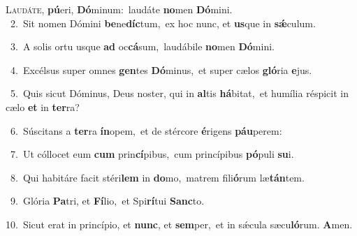 \lettrine{\initial\textcolor{\initialcolor}{L}}{audáte,} \textbf{pú}\-eri, \textbf{Dó}\-minum:~\star laudáte \textbf{no}\-men \textbf{Dó}\-mini.\\
{\numbfont\textcolor{\numbcolor}{~2.}}~Sit nomen Dómini \textbf{be}\-ne\-\textbf{díc}\-tum,~\star ex hoc nunc, et \textbf{us}\-que in \textbf{sǽ}\-culum.\par
{\numbfont\textcolor{\numbcolor}{~3.}}~A solis ortu usque \textbf{ad} oc\-\textbf{cá}\-sum,~\star laudábile \textbf{no}\-men \textbf{Dó}\-mini.\par
{\numbfont\textcolor{\numbcolor}{~4.}}~Excélsus super omnes \textbf{gen}\-tes \textbf{Dó}\-minus,~\star et super cælos \textbf{gló}\-ria \textbf{e}\-jus.\par
{\numbfont\textcolor{\numbcolor}{~5.}}~Quis sicut Dóminus, Deus noster, qui in \textbf{al}\-tis \textbf{há}\-bitat,~\star et humília réspicit in cælo \textbf{et} in \textbf{ter}\-ra?\par
{\numbfont\textcolor{\numbcolor}{~6.}}~Súscitans a \textbf{ter}\-ra \textbf{ín}\-opem,~\star et de stércore \textbf{é}\-rigens \textbf{páu}\-perem:\par
{\numbfont\textcolor{\numbcolor}{~7.}}~Ut cóllocet eum \textbf{cum} prin\-\textbf{cí}\-pibus,~\star cum princípibus \textbf{pó}\-puli \textbf{su}\-i.\par
{\numbfont\textcolor{\numbcolor}{~8.}}~Qui habitáre facit stéri\textbf{lem} in \textbf{do}\-mo,~\star matrem fili\-\textbf{ó}\-rum læ\-\textbf{tán}\-tem.\par
{\numbfont\textcolor{\numbcolor}{~9.}}~Glória \textbf{Pa}\-tri, et \textbf{Fí}\-lio,~\star et Spi\-\textbf{rí}\-tui \textbf{Sanc}\-to.\par
{\numbfont\textcolor{\numbcolor}{10.}}~Sicut erat in princípio, et \textbf{nunc}\-, et \textbf{sem}\-per,~\star et in sǽcula sæcu\-\textbf{ló}\-rum. \textbf{A}\-men.\par
